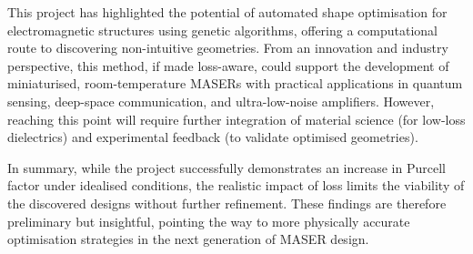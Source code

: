 This project has highlighted the potential of automated shape optimisation for
electromagnetic structures using genetic algorithms, offering a computational
route to discovering non-intuitive geometries. From an innovation and industry
perspective, this method, if made loss-aware, could support the development of
miniaturised, room-temperature MASERs with practical applications in quantum
sensing, deep-space communication, and ultra-low-noise amplifiers. However,
reaching this point will require further integration of material science (for
low-loss dielectrics) and experimental feedback (to validate optimised
geometries).

In summary, while the project successfully demonstrates an increase in Purcell
factor under idealised conditions, the realistic impact of loss limits the
viability of the discovered designs without further refinement. These findings
are therefore preliminary but insightful, pointing the way to more physically
accurate optimisation strategies in the next generation of MASER design.
